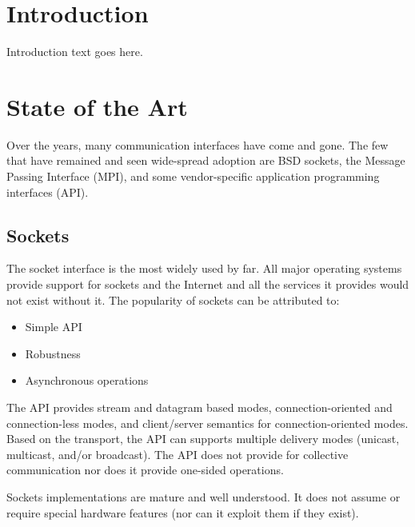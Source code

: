\documentclass[conference]{IEEEtran}
\begin{document}
\IEEEpeerreviewmaketitle

\newcommand{\note}[1]{\colorbox{yellow!50}{Note: #1}}

\newcommand{\f}[1]{\texttt{#1{\kern-2pt}()}}

\section{Introduction}
Introduction text goes here.

\section{State of the Art}
Over the years, many communication interfaces have come and gone. The few that have
remained and seen wide-spread adoption are BSD sockets\cite{bsd}, the Message Passing
Interface (MPI)\cite{mpi}, and some vendor-specific application programming interfaces
(API).

\subsection{Sockets} The socket interface is the most widely used by far. All major
operating systems provide support for sockets and the Internet and all the services it
provides would not exist without it. The popularity of sockets can be attributed to:

\begin{itemize}
\item Simple API
\item Robustness
\item Asynchronous operations
\end{itemize}

The API provides stream and datagram based modes, connection-oriented and connection-less
modes, and client/server semantics for connection-oriented modes. Based on the transport,
the API can supports multiple delivery modes (unicast, multicast, and/or broadcast). The
API does not provide for collective communication nor does it provide one-sided
operations.

Sockets implementations are mature and well understood. It does not assume or require
special hardware features (nor can it exploit them if they exist).
\end{document}
